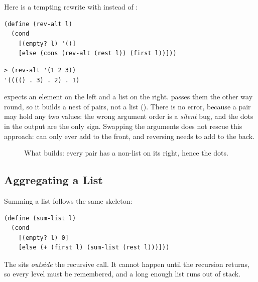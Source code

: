 Here is a tempting rewrite with  instead of :
\begin{lstlisting}
(define (rev-alt l)
  (cond
    [(empty? l) '()]
    [else (cons (rev-alt (rest l)) (first l))]))
\end{lstlisting}
\begin{lstlisting}[style=repl]
> (rev-alt '(1 2 3))
'(((() . 3) . 2) . 1)
\end{lstlisting}

\begin{pitfall}
 expects an element on the left and a list on the right.  passes them the other way round, so it builds a nest of pairs, not a list (). There is no error, because a pair may hold any two values: the wrong argument order is a \emph{silent} bug, and the dots in the output are the only sign. Swapping the arguments does not rescue this approach:  can only ever add to the front, and reversing needs to add to the back.
\end{pitfall}

\begin{figure}[htbp]
\centering
{}
\caption{What  builds: every pair has a non-list on its right, hence the dots.}
\label{fig:revalt}
\end{figure}

\subsection{Aggregating a List}

Summing a list follows the same skeleton:
\begin{lstlisting}
(define (sum-list l)
  (cond
    [(empty? l) 0]
    [else (+ (first l) (sum-list (rest l)))]))
\end{lstlisting}
The \code{+} sits \emph{outside} the recursive call. It cannot happen until the recursion returns, so every level must be remembered, and a long enough list runs out of stack.

